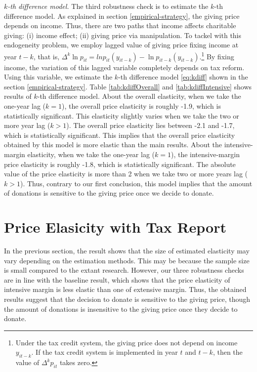 \documentclass[
  11pt,
  a4paper,
]{article}
\begin{document}
\emph{\(k\)-th difference model.}
The third robustness check is to estimate the \(k\)-th difference model.
As explained in section \ref{empirical-strategy}, the giving price depends on income.
Thus, there are two paths that income affects charitable giving: (i) income effect; (ii) giving price via manipulation.
To tackel with this endogeneity problem, we employ lagged value of giving price fixing income at year \(t-k\),
that is, \(\Delta^k \ln p_{it} = ln p_{it}(y_{it-k}) - \ln p_{it-k}(y_{it-k})\).\footnote{Under the tax credit system, the giving price does not depend on income \(y_{it-k}\). If the tax credit system is implemented in year \(t\) and \(t-k\), then the value of \(\Delta^k p_{it}\) takes zero.}
By fixing income, the variation of this lagged variable completely depends on tax reform.
Using this variable,
we estimate the \(k\)-th difference model \eqref{eq:kdiff} shown in the section \ref{empirical-strategy}.
Table \ref{tab:kdiffOverall} and \ref{tab:kdiffIntensive} shows results of \(k\)-th difference model.
About the overall elasticity,
when we take the one-year lag (\(k = 1\)), the overall price elasticity is roughly -1.9,
which is statistically significant.
This elasticity slightly varies when we take the two or more year lag (\(k > 1\)).
The overall price elasticity lies between -2.1 and -1.7, which is statistically significant.
This implies that the overall price elasticity obtained by this model is more elastic than the main results.
About the intensive-margin elasticity,
when we take the one-year lag (\(k = 1\)), the intensive-margin price elasticity is roughly -1.8,
which is statistically significant.
The absolute value of the price elasticity is more than 2
when we take two or more years lag (\(k > 1\)).
Thus, contrary to our first conclusion,
this model implies that the amount of donations is sensitive to the giving price once we decide to donate.

\hypertarget{price-elasicity-with-tax-report}{%
\section{Price Elasicity with Tax Report}\label{price-elasicity-with-tax-report}}

In the previous section,
the result shows that the size of estimated elasticity may vary depending on the estimation methods.
This may be because the sample size is small compared to the extant research.
However, our three robustness checks are in line with the baseline result,
which shows that the price elasticity of intensive margin is less elastic than one of extensive margin.
Thus, the obtained results suggest that the decision to donate is sensitive to the giving price,
though the amount of donations is insensitive to the giving price once they decide to donate.
\end{document}
